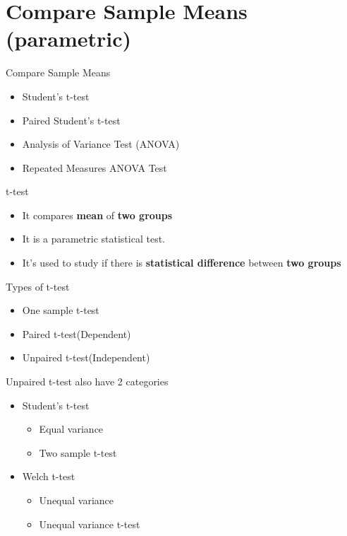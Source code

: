 


\maketitle
\section{Compare Sample Means (parametric)}
\begin{frame}[t]{Compare Sample Means}
    \begin{itemize}
      \item Student’s t-test
      \item Paired Student’s t-test
      \item Analysis of Variance Test (ANOVA)
      \item Repeated Measures ANOVA Test
	\end{itemize}
\end{frame}
\begin{frame}[t]{t-test}
	\begin{itemize}
		\item It compares \textbf{mean} of \textbf{two groups}
		\item It is a parametric statistical test.
		\item It's used to study if there is \textbf{statistical difference} between \textbf{two groups}
	\end{itemize}
\end{frame}

\begin{frame}[t]{Types of t-test}
	\begin{itemize}
		\item One sample t-test
		\item Paired t-test(Dependent)
		\item Unpaired t-test(Independent)
	\end{itemize}
	Unpaired t-test also have 2 categories \\
		\begin{itemize}
			\item Student's t-test
				\begin{itemize}
				\item Equal variance
				\item Two sample t-test
				\end{itemize}
			\item Welch t-test
				\begin{itemize}
				\item Unequal variance
				\item Unequal variance t-test
				\end{itemize}
		\end{itemize}
\end{frame}

